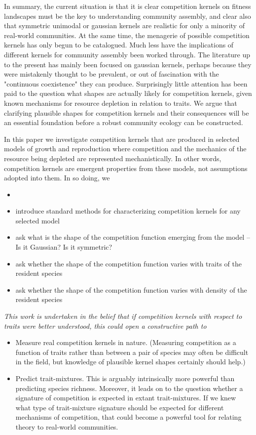 \documentclass[a4paper,11pt]{article}
\begin{document}
In summary, the current situation is that it is clear competition kernels on fitness landscapes must be the key to understanding community assembly, and clear also that symmetric unimodal or gaussian kernels are realistic for only a minority of real-world communities. At the same time, the menagerie of possible competition kernels has only begun to be catalogued. Much less have the implications of different kernels for community assembly been worked through. The literature up to the present has mainly been focused on gaussian kernels, perhaps because they were mistakenly thought to be prevalent, or out of fascination with the "continuous coexistence" they can produce. Surprisingly little attention has been paid to the question what shapes are actually likely for competition kernels, given known mechanisms for resource depletion in relation to traits. We argue that clarifying plausible shapes for competition kernels and their consequences will be an essential foundation before a robust community ecology can be constructed.

In this paper we investigate competition kernels that are produced in selected models of growth and reproduction where competition and the mechanics of the resource being depleted are represented mechanistically. In other words, competition kernels are emergent properties from these models, not assumptions adopted into them. In so doing, we
\begin{itemize}
\item
\item introduce standard methods for characterizing competition kernels for any selected model
\item ask what is the shape of the competition function emerging from the model -- Is it Gaussian? Is it symmetric?
\item ask whether the shape of the competition function varies with traits of the resident species
\item ask whether the shape of the competition function varies with density of the resident species
\end{itemize}

\textit{This work is undertaken in the belief that if competition kernels with respect to traits were better understood, this could open a constructive path to}
\begin{itemize}
\item Measure real competition kernels in nature. (Measuring competition as a function of traits rather than between a pair of species may often be difficult in the field, but knowledge of plausible kernel shapes certainly should help.)
\item Predict trait-mixtures. This is arguably intrinsically more powerful than predicting species richness. Moreover, it leads on to the question whether a signature of competition is expected in extant trait-mixtures. If we knew what type of trait-mixture signature should be expected for different mechanisms of competition, that could become a powerful tool for relating theory to real-world communities.
\end{itemize}
\end{document}

